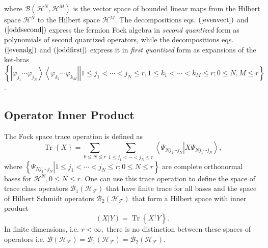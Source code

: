 \documentclass[aps,preprint]{revtex4}%
\begin{document}
where $\mathcal{B}\left(  \mathcal{H}^{N},\mathcal{H}^{M}\right)  $ is the
vector space of bounded linear maps from the Hilbert space $\mathcal{H}^{N}$
to the Hilbert space $\mathcal{H}^{M}.$ The decompositions eqs. $\left(
\ref{evenvect}\right)  $ and $\left(  \ref{oddsecond}\right)  $ express the
fermion Fock algebra in \emph{second quantized} form as polynomials of second
quantized operators, while the decompositions eqs. $\left(  \ref{evenalg}%
\right)  $ and $\left(  \ref{oddfirst}\right)  $ express it in \emph{first
quantized} form as expansions of the ket-bras
\begin{equation}
\left\{  \left.  \left\vert \varphi_{j_{1}}\cdots\varphi_{j_{N}}\right\rangle
\left\langle \varphi_{k_{1}}\cdots\varphi_{k_{M}}\right\vert \right\vert 1\leq
j_{1}<\cdots<j_{N}\leq r,1\leq k_{1}<\cdots<k_{M}\leq r;0\leq N,M\leq
r\right\}
\end{equation}
.

\subsection{Operator Inner Product \label{Inner prod}}

The Fock space trace operation is defined as
\begin{equation}
\operatorname*{Tr}\left\{  X\right\}  =\sum_{0\leq N\leq r}\sum_{1\leq
j_{1}<\cdots<j_{N}\leq r}\left\langle \Psi_{Nj_{1}\cdots j_{N}}\left\vert
X\Psi_{Nj_{1}\cdots j_{N}}\right.  \right\rangle ,
\end{equation}
where $\left\{  \left.  \Psi_{Nj_{1}\cdots j_{N}}\right\vert 1\leq
j_{1}<\cdots<j_{N}\leq r;0\leq N\leq r\right\}  $ are complete orthonormal
bases for $\mathcal{H}^{N},0\leq N\leq r.$ One can use this trace operation to
define the space of trace class operators $\mathcal{B}_{1}\left(
\mathcal{H}_{\mathcal{F}}\right)  $ that have finite trace for all bases and
the space of Hilbert Schmidt operators $\mathcal{B}_{2}\left(  \mathcal{H}%
_{\mathcal{F}}\right)  $ that form a Hilbert space with inner product
\begin{equation}
\left(  X\left\vert Y\right.  \right)  =\operatorname*{Tr}\left\{  X^{\dagger
}Y\right\}  .
\end{equation}
In finite dimensions, i.e. $r<\infty,$ there is no distinction between these
spaces of operators i.e. $\mathcal{B}\left(  \mathcal{H}_{\mathcal{F}}\right)
=\mathcal{B}_{1}\left(  \mathcal{H}_{\mathcal{F}}\right)  =\mathcal{B}%
_{2}\left(  \mathcal{H}_{\mathcal{F}}\right)  .$
\end{document}
